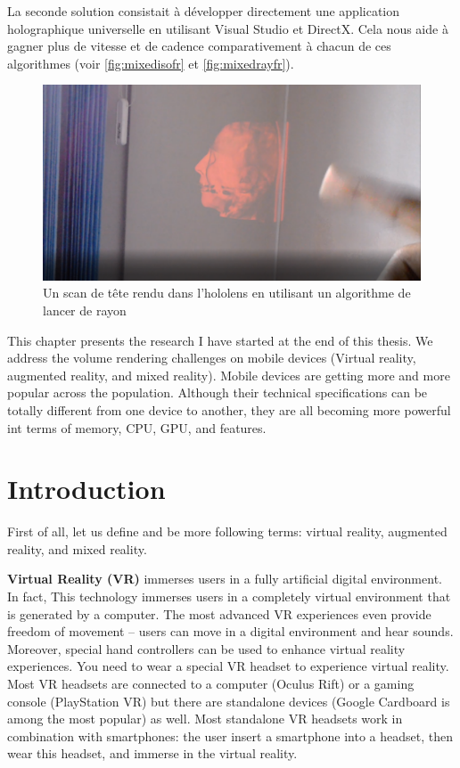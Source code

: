 La seconde solution consistait à développer directement une application holographique universelle en utilisant Visual Studio et DirectX. Cela nous aide à gagner plus de vitesse et de cadence comparativement à chacun de ces algorithmes (voir \autoref{fig:mixedisofr} et \autoref{fig:mixedrayfr}).




\begin{figure}
\centering
\includegraphics [width=\textwidth]{Figures/mixedray}
\caption{Un scan de tête rendu dans l'hololens en utilisant un algorithme de lancer de rayon }
\label{fig:mixedrayfr}
\end{figure}

\NewPage

This chapter presents the research I have started at the end of this thesis. 
We address the volume rendering challenges on mobile devices (Virtual reality, augmented reality, and mixed reality). Mobile devices are getting more and more popular across the population. Although their technical specifications can be totally different from one device to another, they are all becoming more powerful int terms of memory, CPU, GPU, and features.

\section{Introduction}

First of all, let us define and be more following terms: virtual reality, augmented reality, and mixed reality.

\par \textbf{ Virtual Reality (VR)} immerses users in a fully artificial digital environment. In fact, This technology immerses users in a completely virtual environment that is generated by a computer. The most advanced VR experiences even provide freedom of movement – users can move in a digital environment and hear sounds. Moreover, special hand controllers can be used to enhance  virtual reality experiences.\newline
You need to wear a special VR headset to experience virtual reality. Most VR headsets are connected to a computer (Oculus Rift) or a gaming console (PlayStation VR) but there are standalone devices (Google Cardboard is among the most popular) as well. Most standalone VR headsets work in combination with smartphones: the user insert a smartphone into a headset, then wear this headset, and immerse in the virtual reality.

